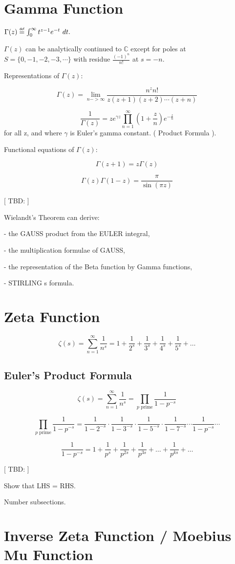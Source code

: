 \newpage

\section{Gamma Function}

$\Gamma(z) \myeq \int_{0}^{\infty} t^{z-1} e^{-t}\ dt .$ 

\noindent $\Gamma(z)$ can be analytically continued to $\mathbb{C}$ except for
poles at $S=\{0, -1, -2, -3, \cdots \}$ with residue $\frac{(-1)^n}{n!}$ at
$s=-n$.

Representations of $\Gamma(z)$:

$$\Gamma(z) = \lim_{n->\infty} \frac{n^{z}n!}{z(z+1)(z+2) \cdots (z+n)}$$

$$\frac{1}{\Gamma(z)} = z e^{\gamma z} \prod_{n=1}^{\infty}
(1+\frac{z}{n})e^{-\frac{z}{n}}$$
for all z, and where $\gamma$ is Euler's gamma constant. ( Product Formula ).

Functional equations of $\Gamma(z)$:

$$\Gamma(z+1) = z \Gamma(z)$$

$$\Gamma(z)\Gamma(1-z) = \frac{\pi}{\sin{(\pi z)}}$$


[ TBD: ]

Wielandt's Theorem can derive:

- the GAUSS product from the EULER integral,

- the multiplication formulae of GAUSS,

- the representation of the Beta function by Gamma functions,

- STIRLING s formula.


\section{Zeta Function}

$$\zeta(s) = \sum_{n=1}^\infty\frac{1}{n^s} = 1+\frac{1}{2^s}+\frac{1}{3^s}+\frac{1}{4^s}+\frac{1}{5^s}+ \ldots$$

\subsection{Euler's Product Formula}

$$\zeta(s) = \sum_{n=1}^\infty\frac{1}{n^s} = \prod_{p \text{ prime}} \frac{1}{1-p^{-s}}$$

$$\prod_{p \text{ prime}} \frac{1}{1-p^{-s}} = \frac{1}{1-2^{-s}}\cdot\frac{1}{1-3^{-s}}\cdot\frac{1}{1-5^{-s}}\cdot\frac{1}{1-7^{-s}} \cdots \frac{1}{1-p^{-s}} \cdots$$

$$ \frac{1}{1-p^{-s}} = 1 + \frac{1}{p^s} + \frac{1}{p^{2s}} + \frac{1}{p^{3s}} + \ldots + \frac{1}{p^{ks}} + \ldots $$ 


[ TBD: ]

Show that LHS = RHS.

Number subsections.


\section{Inverse Zeta Function / Moebius Mu Function}
